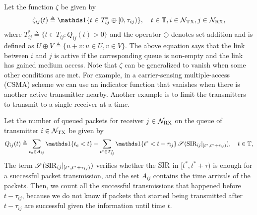 \begin{example}
    Let the function $\zeta$ be given by
    \begin{align*}
        \zeta_{ij}(t) \triangleq \ind\{t\in T_{ij}^*\oplus[0,\tau_{ij})\}, \quad t\in\T, i\in\cal{N}_\TX, j\in\cal{N}_\RX,
    \end{align*}
    where $T_{ij}^* \triangleq \{t\in T_{ij}: Q_{ij}(t)>0\}$ and the operator $\oplus$ denotes set addition and is defined as $U\oplus V \triangleq \{u+v : u\in U, v\in V\}$.
    The above equation says that the link between $i$ and $j$ is active if the corresponding queue is non-empty and the link has gained medium access. %
    Note that $\zeta$ can be generalized to vanish when some other conditions are met.
    For example, in a carrier-sensing multiple-access (CSMA) scheme we can use an indicator function that vanishes when there is another active transmitter nearby.
    Another example is to limit the transmitters to transmit to a single receiver at a time.
    
    Let the number of queued packets for receiver $j\in\mathcal{N}_{\mathrm{RX}}$ on the queue of transmitter $i\in\mathcal{N}_{\mathrm{TX}}$ be given by
    \begin{align*}
        Q_{ij}(t) \triangleq \sum_{t_a\in A_{ij}} \ind\{t_a < t\} - \sum_{t^*\in T_{ij}^*} \ind\{t^* < t-\tau_{ij}\}\,\mathscr{S}(\SIR_{ij}\vert_{[t^*,t^*+\tau_{ij})}) , \quad t\in\T,
    \end{align*}
    The term $\mathscr{S}(\mathrm{SIR}_{ij}\vert_{[t^*,t^*+\tau_{ij})})$ verifies whether the $\mathrm{SIR}$ in $[t^*,t^*+\tau)$ is enough for a successful packet transmission, and the set $A_{ij}$ contains the time arrivals of the packets. 
    Then, we count all the successful transmissions that happened before $t-\tau_{ij}$, because we do not know if packets that started being transmitted after $t-\tau_{ij}$ are successful given the information until time $t$.
\end{example}

